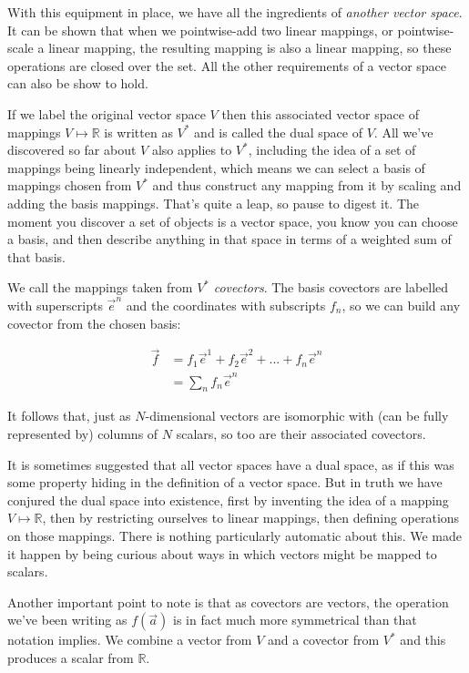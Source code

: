 With this equipment in place, we have all the ingredients of \textit{another vector space}. It can be shown that when we pointwise-add two linear mappings, or pointwise-scale a linear mapping, the resulting mapping is also a linear mapping, so these operations are closed over the set. All the other requirements of a vector space can also be show to hold.

If we label the original vector space $V$ then this associated vector space of mappings $V \mapsto \mathbb{R}$ is written as $V^*$ and is called the dual space of $V$. All we've discovered so far about $V$ also applies to $V^*$, including the idea of a set of mappings being linearly independent, which means we can select a basis of mappings chosen from $V^*$ and thus construct any mapping from it by scaling and adding the basis mappings. That's quite a leap, so pause to digest it. The moment you discover a set of objects is a vector space, you know you can choose a basis, and then describe anything in that space in terms of a weighted sum of that basis.

We call the mappings taken from $V^*$ \textit{covectors}. The basis covectors are labelled with superscripts $\vec{e}^n$ and the coordinates with subscripts $f_n$, so we can build any covector from the chosen basis:

\begin{equation}
    \begin{split}
    \vec{f} &= f_1 \vec{e}^1 + f_2 \vec{e}^2 + ... + f_n \vec{e}^n \\
            &= \sum_n f_n \vec{e}^n
    \end{split}
\end{equation}

It follows that, just as $N$-dimensional vectors are isomorphic with (can be fully represented by) columns of $N$ scalars, so too are their associated covectors.

It is sometimes suggested that all vector spaces have a dual space, as if this was some property hiding in the definition of a vector space. But in truth we have conjured the dual space into existence, first by inventing the idea of a mapping $V \mapsto \mathbb{R}$, then by restricting ourselves to linear mappings, then defining operations on those mappings. There is nothing particularly automatic about this. We made it happen by being curious about ways in which vectors might be mapped to scalars.

Another important point to note is that as covectors are vectors, the operation we've been writing as $f(\vec{a})$ is in fact much more symmetrical than that notation implies. We combine a vector from $V$ and a covector from $V^*$ and this produces a scalar from $\mathbb{R}$. 


